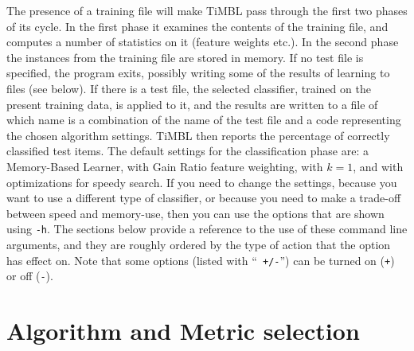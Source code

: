 \documentclass{report}
\begin{document}
The presence of a training file will make TiMBL pass through the first
two phases of its cycle. In the first phase it examines the contents
of the training file, and computes a number of statistics on it
(feature weights etc.). In the second phase the instances from the
training file are stored in memory. If no test file is specified, the
program exits, possibly writing some of the results of learning to
files (see below). If there is a test file, the selected classifier,
trained on the present training data, is applied to it, and the
results are written to a file of which name is a combination of the
name of the test file and a code representing the chosen algorithm
settings. TiMBL then reports the percentage of correctly classified
test items. The default settings for the classification phase are: a
Memory-Based Learner, with Gain Ratio feature weighting, with $k=1$,
and with optimizations for speedy search. If you need to change the
settings, because you want to use a different type of classifier, or
because you need to make a trade-off between speed and memory-use,
then you can use the options that are shown using {\tt -h}. The
sections below provide a reference to the use of these command line
arguments, and they are roughly ordered by the type of action that the
option has effect on. Note that some options (listed with ``{\tt
+/-}'') can be turned on ({\tt +}) or off ({\tt -}).

\section{Algorithm and Metric selection}
\end{document}
